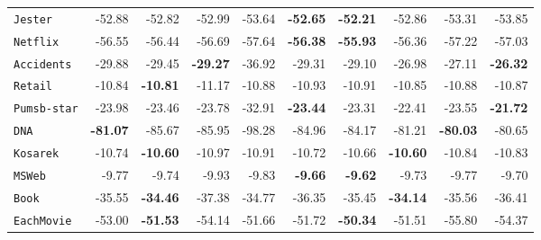 \documentclass[xcolor={usenames,dvipsnames,svgnames}, compress]{beamer}
\begin{document}
\begin{frame}[t]
\begin{table}[t]
\begin{tabular}{l r r r r  r | r r r r}
    \texttt{Jester}     & -52.88                               & -52.82                                & -52.99                 & -53.64  & \textbf{-52.65}  & \textbf{-52.21}  & -52.86         & -53.31          & -53.85          \\ 
    \texttt{Netflix}    & -56.55                               & -56.44                                & -56.69                 & -57.64  & \textbf{-56.38}  & \textbf{-55.93}  & -56.36         & -57.22          & -57.03          \\ 
    \texttt{Accidents}  & -29.88                               & -29.45                                & \textbf{-29.27}                 & -36.92  & -29.31  & -29.10           & -26.98         & -27.11          & \textbf{-26.32} \\ 
    \texttt{Retail}     & -10.84                               & \textbf{-10.81}                                & -11.17                 & -10.88  & -10.93  & -10.91           & -10.85         & -10.88          & -10.87          \\ 
    \texttt{Pumsb-star} & -23.98                               & -23.46                                & -23.78                 & -32.91  & \textbf{-23.44}  & -23.31           & -22.41         & -23.55          & \textbf{-21.72} \\ 
    \texttt{DNA}        &\textbf{-81.07}                               & -85.67                                & -85.95                 & -98.28  & -84.96  & -84.17           & -81.21         & \textbf{-80.03} & -80.65          \\ 
    \texttt{Kosarek}    & -10.74                               & \textbf{-10.60}                                & -10.97                 & -10.91  & -10.72  & -10.66           & \textbf{-10.60}         & -10.84          & -10.83          \\ 
    \texttt{MSWeb}      & -9.77                                & -9.74                                 & -9.93                  & -9.83   & \textbf{-9.66}   & \textbf{-9.62}   & -9.73          & -9.77           & -9.70           \\ 
    \texttt{Book}       & -35.55                               & \textbf{-34.46}                                & -37.38                 & -34.77  & -36.35  & -35.45           & \textbf{-34.14}         & -35.56          & -36.41          \\ 
    \texttt{EachMovie}  & -53.00                               & \textbf{-51.53}                                & -54.14                 & -51.66  & -51.72  & \textbf{-50.34}  & -51.51         & -55.80          & -54.37          \\ 

\end{tabular}
\end{table}
\end{frame}
\end{document}
